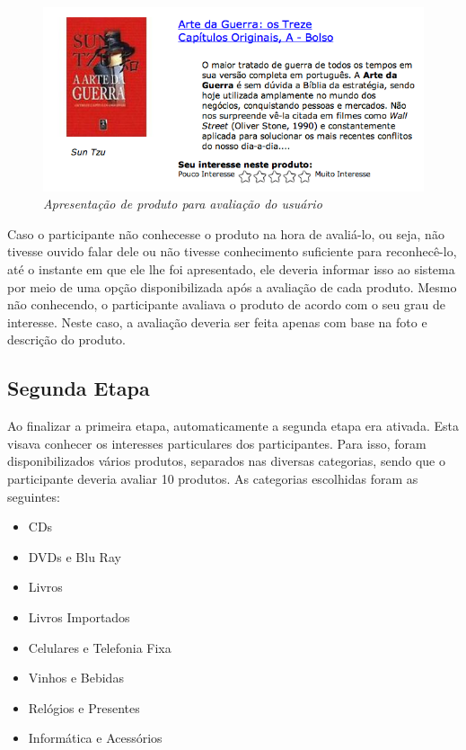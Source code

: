 \begin{figure}[htp]
  \centering
  \includegraphics[width=\textwidth]{imagens/product-rating}
  \caption{\it Apresentação de produto para avaliação do usuário}
  \label{fig:product-rating}
\end{figure}

Caso o participante não conhecesse o produto na hora de avaliá-lo, ou seja, não tivesse ouvido falar dele ou não tivesse conhecimento suficiente para reconhecê-lo, até o instante em que ele lhe foi apresentado, ele deveria informar isso ao sistema por meio de uma opção disponibilizada após a avaliação de cada produto. Mesmo não conhecendo, o participante avaliava o produto de acordo com o seu grau de interesse. Neste caso, a avaliação deveria ser feita apenas com base na foto e descrição do produto.

\subsection{Segunda Etapa}
\label{cha:segunda_etapa}

Ao finalizar a primeira etapa, automaticamente a segunda etapa era ativada. Esta visava conhecer os interesses particulares dos participantes. Para isso, foram disponibilizados vários produtos, separados nas diversas categorias, sendo que o participante deveria avaliar 10 produtos. As categorias escolhidas foram as seguintes:

\begin{itemize}
  \item CDs
  \item DVDs e Blu Ray
  \item Livros
  \item Livros Importados
  \item Celulares e Telefonia Fixa
  \item Vinhos e Bebidas
  \item Relógios e Presentes
  \item Informática e Acessórios
\end{itemize}

